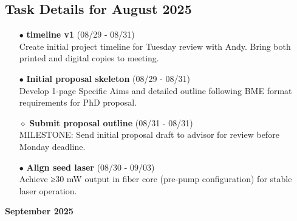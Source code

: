 \documentclass[landscape,a4paper]{article}
\begin{document}
\subsection{Task Details for August 2025}
\begin{itemize}[leftmargin=1cm]
    \item[\textcolor{researchcore}{$\bullet$}] \textbf{timeline v1} (08/29 - 08/31)\\ Create initial project timeline for Tuesday review with Andy. Bring both printed and digital copies to meeting.
    \item[\textcolor{researchcore}{$\bullet$}] \textbf{Initial proposal skeleton} (08/29 - 08/31)\\ Develop 1-page Specific Aims and detailed outline following BME format requirements for PhD proposal.
    \item[\textcolor{researchcore}{$\diamond$}] \textbf{Submit proposal outline} (08/31 - 08/31)\\ MILESTONE: Send initial proposal draft to advisor for review before Monday deadline.
    \item[\textcolor{researchexp}{$\bullet$}] \textbf{Align seed laser} (08/30 - 09/03)\\ Achieve ≥30 mW output in fiber core (pre-pump configuration) for stable laser operation.
\end{itemize}

\newpage
\pagestyle{empty}

\begin{center}
{\large\textbf{September 2025}}
\end{center}

\vspace{0.5cm}
\end{document}
